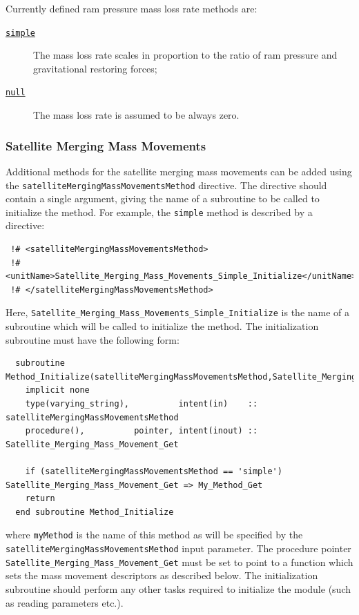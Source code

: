 Currently defined ram pressure mass loss rate methods are:
\begin{description}
 \item [\hyperlink{ram_pressure_stripping.mass_loss_rate.disks.simple.F90:ram_pressure_stripping_mass_loss_rate_disks_simple:ram_pressure_stripping_mass_loss_rate_disk_simple}{{\tt simple}}] The mass loss rate scales in proportion to the ratio of ram pressure and gravitational restoring forces;
 \item [\hyperlink{ram_pressure_stripping.mass_loss_rate.disks.null.F90:ram_pressure_stripping_mass_loss_rate_disks_null:ram_pressure_stripping_mass_loss_rate_disk_null}{{\tt null}}] The mass loss rate is assumed to be always zero.
\end{description}

\subsubsection{Satellite Merging Mass Movements}

Additional methods for the satellite merging mass movements can be added using the {\tt satelliteMergingMassMovementsMethod} directive. The directive should contain a single argument, giving the name of a subroutine to be called to initialize the method. For example, the {\tt simple} method is described by a directive:
\begin{verbatim}
 !# <satelliteMergingMassMovementsMethod>
 !#  <unitName>Satellite_Merging_Mass_Movements_Simple_Initialize</unitName>
 !# </satelliteMergingMassMovementsMethod>
\end{verbatim}
Here, {\tt Satellite\_Merging\_Mass\_Movements\_Simple\_Initialize} is the name of a subroutine which will be called to initialize the method. The initialization subroutine must have the following form:
\begin{verbatim}
  subroutine Method_Initialize(satelliteMergingMassMovementsMethod,Satellite_Merging_Mass_Movement_Get)
    implicit none
    type(varying_string),          intent(in)    :: satelliteMergingMassMovementsMethod
    procedure(),          pointer, intent(inout) :: Satellite_Merging_Mass_Movement_Get
    
    if (satelliteMergingMassMovementsMethod == 'simple') Satellite_Merging_Mass_Movement_Get => My_Method_Get
    return
  end subroutine Method_Initialize
\end{verbatim}
where {\tt myMethod} is the name of this method as will be specified by the {\tt satelliteMergingMassMovementsMethod} input parameter. The procedure pointer {\tt Satellite\_Merging\_Mass\_Movement\_Get} must be set to point to a function which sets the mass movement descriptors as described below. The initialization subroutine should perform any other tasks required to initialize the module (such as reading parameters etc.).

